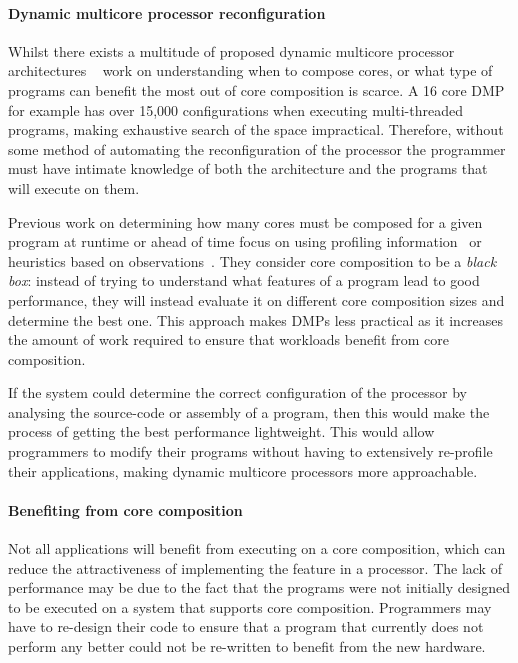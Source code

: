 \paragraph*{Dynamic multicore processor reconfiguration}
Whilst there exists a multitude of proposed dynamic multicore processor architectures ~\cite{MittalSurv2016} work on understanding when to compose cores, or what type of programs can benefit the most out of core composition is scarce.
A 16 core DMP for example has over 15,000 configurations when executing multi-threaded programs, making exhaustive search of the space impractical.
Therefore, without some method of automating the reconfiguration of the processor the programmer must have intimate knowledge of both the architecture and the programs that will execute on them.

Previous work on determining how many cores must be composed for a given program at runtime or ahead of time focus on using profiling information~\cite{pricopiSchedCoreComp2014} or heuristics based on observations~\cite{gulati2008multitaskingdmc}.
They consider core composition to be a \textit{black box}: instead of trying to understand what features of a program lead to good performance, they will instead evaluate it on different core composition sizes and determine the best one.
This approach makes DMPs less practical as it increases the amount of work required to ensure that workloads benefit from core composition.

If the system could determine the correct configuration of the processor by analysing the source-code or assembly of a program, then this would make the process of getting the best performance lightweight.
This would allow programmers to modify their programs without having to extensively re-profile their applications, making dynamic multicore processors more approachable.

\paragraph*{Benefiting from core composition}
Not all applications will benefit from executing on a core composition, which can reduce the attractiveness of implementing the feature in a processor.
The lack of performance may be due to the fact that the programs were not initially designed to be executed on a system that supports core composition.
Programmers may have to re-design their code to ensure that a program that currently does not perform any better could not be re-written to benefit from the new hardware.

